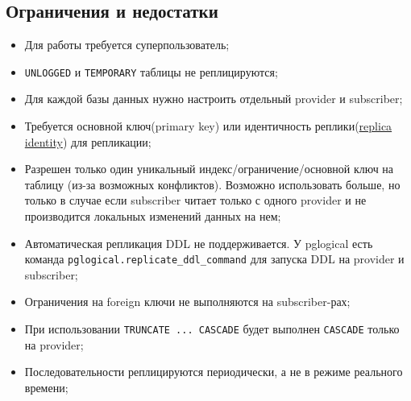 \subsection{Ограничения и недостатки}

\begin{itemize}
  \item Для работы требуется суперпользователь;
  \item \lstinline!UNLOGGED! и \lstinline!TEMPORARY! таблицы не реплицируются;
  \item Для каждой базы данных нужно настроить отдельный provider и subscriber;
  \item Требуется основной ключ(primary key) или идентичность реплики(\href{http://www.postgresql.org/docs/current/static/sql-altertable.html#SQL-CREATETABLE-REPLICA-IDENTITY}{replica identity}) для репликации;
  \item Разрешен только один уникальный индекс/ограничение/основной ключ на таблицу (из-за возможных конфликтов). Возможно использовать больше, но только в случае если subscriber читает только с одного provider и не производится локальных изменений данных на нем;
  \item Автоматическая репликация DDL не поддерживается. У pglogical есть команда \lstinline!pglogical.replicate_ddl_command! для запуска DDL на provider и subscriber;
  \item Ограничения на foreign ключи не выполняются на subscriber-рах;
  \item При использовании \lstinline!TRUNCATE ... CASCADE! будет выполнен \lstinline!CASCADE! только на provider;
  \item Последовательности реплицируются периодически, а не в режиме реального времени;
\end{itemize}


